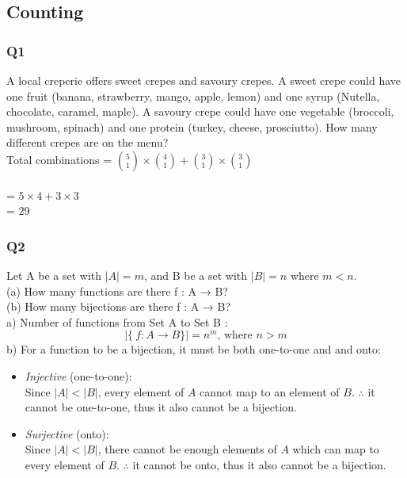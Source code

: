 \documentclass{article}
\begin{document}
\newpage
\subsection{Counting}
\subsubsection{Q1}
A local creperie offers sweet crepes and savoury crepes. A sweet crepe could have one fruit (banana, strawberry, mango, apple, lemon) and one syrup (Nutella, chocolate, caramel, maple). A savoury crepe could have one vegetable (broccoli, mushroom, spinach) and one protein (turkey, cheese, prosciutto). How many different crepes are on the menu?
\\

\hspace{20mm} Total combinations = ${5 \choose 1} \times {4 \choose 1} + {3 \choose 1} \times {3 \choose 1}$\\
\\ 
\hspace{40mm} = $5 \times 4 + 3 \times 3$\\
\hspace{40mm} = $29$ \\



\subsubsection{Q2}
Let A be a set with $|A| = m$, and B be a set with $|B| = n$ where $m < n$.\\(a) How many
functions are there f : A → B?\\(b) How many bijections are there f : A → B?\\
a) Number of functions from Set A to Set B :\[|\{\ f: A \rightarrow B\}| = n^m \text{, where } n > m\]
b) For a function to be a bijection, it must be both one-to-one and and onto:
\begin{itemize}
    \item \textit{Injective} (one-to-one): \\
    Since \(|A| < |B|\), every element of \(A\) cannot map to an element of \(B\). 
    $\therefore$ it cannot be one-to-one, thus it also cannot be a bijection.
    
    \item \textit{Surjective} (onto): \\
    Since $|A|<|B|$, there cannot be enough elements of $A$ which can map to every element of $B$.
    $\therefore$ it cannot be onto, thus it also cannot be a bijection.
\end{itemize}
\end{document}
